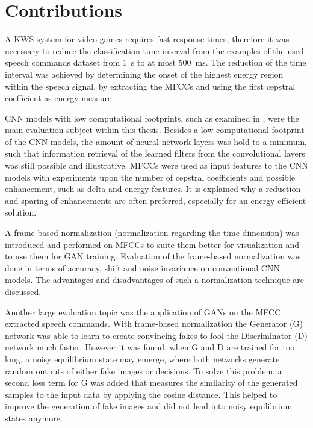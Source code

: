 
\section{Contributions}
A KWS system for video games requires fast response times, therefore it was necessary to reduce the classification time interval from the examples of the used speech commands dataset \cite{Warden2018} from \SI{1}{\second} to at most \SI{500}{\milli\second}.
The reduction of the time interval was achieved by determining the onset of the highest energy region within the speech signal, by extracting the MFCCs and using the first cepstral coefficient as energy measure.

CNN models with low computational footprints, such as examined in \cite{Sainath2015}, were the main evaluation subject within this thesis.
Besides a low computational footprint of the CNN models, the amount of neural network layers was hold to a minimum, such that information retrieval of the learned filters from the convolutional layers was still possible and illustrative.
MFCCs were used as input features to the CNN models with experiments upon the number of cepstral coefficients and possible enhancement, such as delta and energy features.
It is explained why a reduction and sparing of enhancements are often preferred, especially for an energy efficient solution.

A frame-based normalization (normalization regarding the time dimension) was introduced and performed on MFCCs to suite them better for visualization and to use them for GAN training.
Evaluation of the frame-based normalization was done in terms of accuracy, shift and noise invariance on conventional CNN models.
The advantages and disadvantages of such a normalization technique are discussed.

Another large evaluation topic was the application of GANs on the MFCC extracted speech commands. 
With frame-based normalization the Generator (G) network was able to learn to create convincing fakes to fool the Discriminator (D) network much faster.
However it was found, when G and D are trained for too long, a noisy equilibrium state may emerge, where both networks generate random outputs of either fake images or decisions.
To solve this problem, a second loss term for G was added that measures the similarity of the generated samples to the input data by applying the cosine distance.
This helped to improve the generation of fake images and did not lead into noisy equilibrium states anymore.

